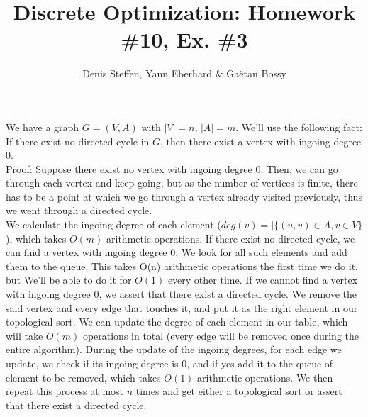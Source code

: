 \documentclass[a4paper,11pt,french]{article}
\title{Discrete Optimization: Homework \#10, Ex. \#3}
\author{Denis Steffen, Yann Eberhard \& Gaëtan Bossy}
\begin{document}
    
    \maketitle
We have a graph $G=(V,A)$ with $|V|=n$, $|A|=m$.
We'll use the following fact: If there exist no directed cycle in $G$, then there exist a vertex with ingoing degree 0. \\
Proof: Suppose there exist no vertex with ingoing degree 0. Then, we can go through each vertex and keep going, but as the number of vertices is finite, there has to be a point at which we go through a vertex already visited previously, thus we went through a directed cycle.\\

We calculate the ingoing degree of each element ($deg(v)=|\{(u,v)\in A,v\in V\}$), which takes $O(m)$ arithmetic operations. If there exist no directed cycle, we can find a vertex with ingoing degree 0. We look for all such elements and add them to the queue. This takes O(n) arithmetic operations the first time we do it, but We'll be able to do it for $O(1)$ every other time. If we cannot find a vertex with ingoing degree 0, we assert that there exist a directed cycle. We remove the said vertex and every edge that touches it, and put it as the right element in our topological sort. We can update the degree of each element in our table, which will take $O(m)$ operations in total (every edge will be removed once during the entire algorithm). During the update of the ingoing degrees, for each edge we update, we check if its ingoing degree is 0, and if yes add it to the queue of element to be removed, which takes $O(1)$ arithmetic operations. We then repeat this process at most $n$ times and get either a topological sort or assert that there exist a directed cycle.
\end{document}
